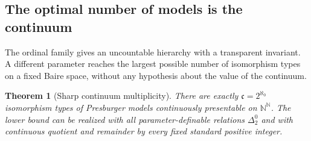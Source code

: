 \documentclass[11pt]{article}
\numberwithin{equation}{section}
\newtheorem{theorem}{Theorem}[section]
\theoremstyle{definition}
\theoremstyle{remark}
\newcommand{\N}{\mathbb N}
\newcommand{\Baire}{\N^{\N}}
\newcommand{\cp}{\mathfrak c}
\begin{document}
\subsection{The optimal number of models is the continuum}

The ordinal family gives an uncountable hierarchy with a transparent
invariant. A different parameter reaches the largest possible number of
isomorphism types on a fixed Baire space, without any hypothesis about
the value of the continuum.

\begin{theorem}[Sharp continuum multiplicity]
\label{pma:cp:thm:continuum}
There are exactly $\cp=2^{\aleph_0}$ isomorphism types of Presburger
models continuously presentable on $\Baire$. The lower bound can be
realized with all parameter-definable relations $\Delta^0_2$ and with
continuous quotient and remainder by every fixed standard positive integer.
\end{theorem}
\end{document}
